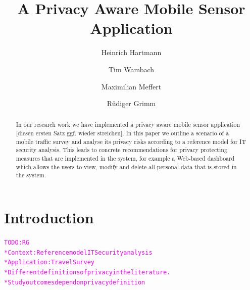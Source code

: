 \documentclass[runningheads,a4paper]{llncs}
\newcommand{\TODO}[1]{\begin{alltt}\textcolor{magenta}{TODO: #1}\end{alltt}}
\begin{document}

\title{A Privacy Aware Mobile Sensor Application}
\author{Heinrich Hartmann \and Tim Wambach \and Maximilian Meffert \and R\"udiger Grimm}
\maketitle


\begin{abstract}

In our research work we have implemented a privacy aware mobile sensor application [diesen ersten Satz ggf. wieder streichen]. In this paper we outline a scenario of a mobile traffic survey and analyse its privacy risks according to a reference model for IT security analysis. This leads to concrete recommendations for privacy protecting measures that are implemented in the system, for example a Web-based dashboard which allows the users to view, modify and delete all personal data that is stored in the system.


\end{abstract}


\section{Introduction}

\TODO{RG\\
* Context: Reference model IT Security analysis\\
* Application: Travel Survey\\
* Different definitions of privacy in the literature.\\
* Study outcomes depend on privacy definition
}
\end{document}
